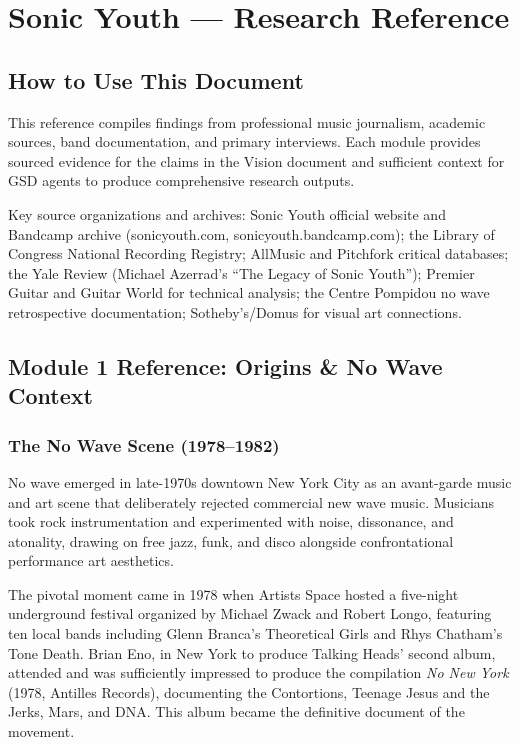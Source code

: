 \documentclass[11pt,letterpaper]{article}
\newcommand{\stageheader}[2]{%
  \noindent\colorbox{#2}{\makebox[\textwidth][l]{%
    \textcolor{white}{\bfseries\sffamily\hspace{6pt}#1\hspace{6pt}}}}%
  \vspace{0.5em}\par%
}
\begin{document}
\newpage

\stageheader{STAGE 2 --- RESEARCH REFERENCE}{secondary}

\section{Sonic Youth --- Research Reference}

\subsection{How to Use This Document}

This reference compiles findings from professional music journalism, academic sources, band documentation, and primary interviews. Each module provides sourced evidence for the claims in the Vision document and sufficient context for GSD agents to produce comprehensive research outputs.

Key source organizations and archives: Sonic Youth official website and Bandcamp archive (sonicyouth.com, sonicyouth.bandcamp.com); the Library of Congress National Recording Registry; AllMusic and Pitchfork critical databases; the Yale Review (Michael Azerrad's ``The Legacy of Sonic Youth''); Premier Guitar and Guitar World for technical analysis; the Centre Pompidou no wave retrospective documentation; Sotheby's/Domus for visual art connections.

\subsection{Module 1 Reference: Origins \& No Wave Context}

\subsubsection{The No Wave Scene (1978--1982)}

No wave emerged in late-1970s downtown New York City as an avant-garde music and art scene that deliberately rejected commercial new wave music. Musicians took rock instrumentation and experimented with noise, dissonance, and atonality, drawing on free jazz, funk, and disco alongside confrontational performance art aesthetics.

The pivotal moment came in 1978 when Artists Space hosted a five-night underground festival organized by Michael Zwack and Robert Longo, featuring ten local bands including Glenn Branca's Theoretical Girls and Rhys Chatham's Tone Death. Brian Eno, in New York to produce Talking Heads' second album, attended and was sufficiently impressed to produce the compilation \textit{No New York} (1978, Antilles Records), documenting the Contortions, Teenage Jesus and the Jerks, Mars, and DNA. This album became the definitive document of the movement.
\end{document}
